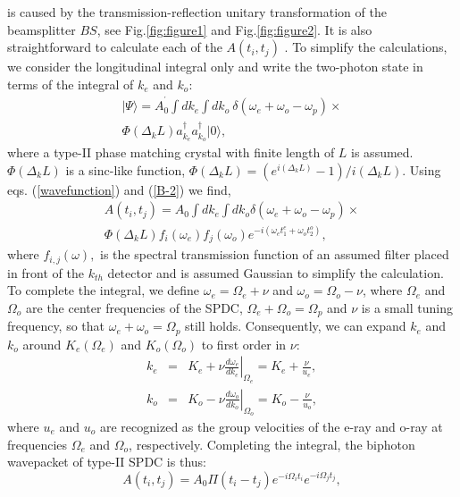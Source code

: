 \documentclass[pra,aps,epsf,12pt]{revtex4-2}
\begin{document}
is caused by the transmission-reflection unitary transformation of the beamsplitter $BS$,
see Fig.\ref{fig:figure1} and Fig.\ref{fig:figure2}. It is also straightforward to
calculate each of the $A(t_{i}, t_{j})$ \cite{function}. To simplify the calculations, we
consider the longitudinal integral only and write the two-photon state in terms of the
integral of $k_{e}$ and $k_{o}$:
\begin{eqnarray}
| \Psi \rangle =A_{0}^{^{\prime}}\int dk_{e}\int dk_{o}\
\delta(\omega_{e}+\omega_{o}-\omega_{p}) \times \nonumber \\ \Phi(\Delta_{k}L)
a_{k_{e}}^{\dagger}a_{k_{o}}^{\dagger}|0\rangle ,  \label{B-2}
\end{eqnarray}
where a type-II phase matching crystal with finite length of $L$ is assumed.
$\Phi(\Delta_{k}L)$ is a sinc-like function,
$\Phi(\Delta_{k}L)=(e^{i(\Delta_{k}L)}-1)/i(\Delta_{k}L)$. Using eqs.
(\ref{wavefunction}) and (\ref{B-2}) we find,
\begin{eqnarray}
A(t_{i}, t_{j})=A_{0}\int dk_{e}\int dk_{o} \delta(\omega_{e}+\omega_{o}-\omega_{p})
\times \nonumber \\
\Phi(\Delta_{k}L) f_{i}(\omega_{e})f_{j}(\omega_{o})
e^{-i(\omega_{e}t_{1}^{e}+\omega_{o}t_{2}^{o})} , \label{B-5}
\end{eqnarray}
where $f_{i,j}(\omega ),$ is the spectral transmission function of an assumed filter
placed in front of the $k_{th}$ detector and is assumed Gaussian to simplify the
calculation. To complete the integral, we define $\omega_{e}=\Omega_{e}+\nu$ and
$\omega_{o}=\Omega_{o}-\nu$, where $\Omega_{e}$ and $\Omega_{o}$ are the center
frequencies of the SPDC, $\Omega_{e}+\Omega_{o}=\Omega_{p}$ and $\nu$ is a small tuning
frequency, so that $\omega_{e}+\omega_{o}=\Omega_{p}$ still holds. Consequently, we can
expand $k_{e}$ and $k_{o}$ around $K_{e}(\Omega_{e})$ and $K_{o}(\Omega_{o})$ to first
order in $\nu$:
\begin{eqnarray}
k_{e} &=& K_{e}+\nu \left.\frac{d\omega_{e}}{dk_{e}}\right|_{\Omega_{e}} = K_{e}+%
\frac{\nu}{u_{e}} , \nonumber \\ k_{o} &=& K_{o}-\nu
\left.\frac{d\omega_{o}}{dk_{o}}\right|_{\Omega_{o}} = K_{o}-\frac{\nu}{u_{o}} ,
\label{B-6}
\end{eqnarray}
where $u_{e}$ and $u_{o}$ are recognized as the group velocities of the e-ray and o-ray
at frequencies $\Omega_{e}$ and $\Omega_{o}$, respectively. Completing the integral, the
biphoton wavepacket of type-II SPDC is thus:
\begin{equation}
A(t_{i}, t_{j})=A_{0} \Pi(t_{i}-t_{j}) e^{-i\Omega_{i}t_{i}} e^{-i\Omega_{j}t_{j}} ,
\label{B-14}
\end{equation}
\end{document}
